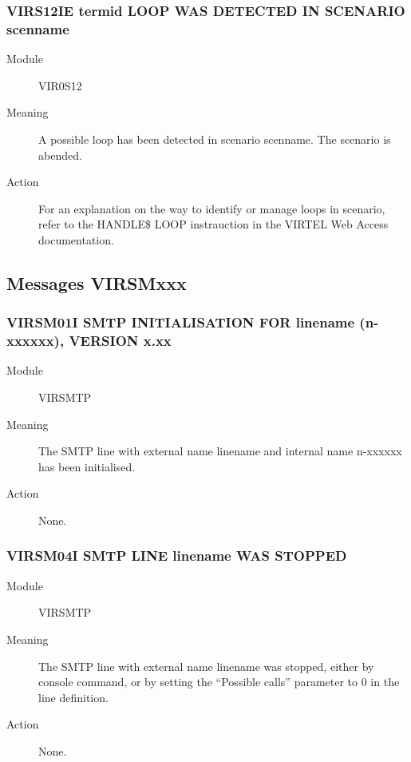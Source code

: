 \documentclass[letterpaper,10pt,english]{sphinxmanual}
\begin{document}
\subsubsection{VIRS12IE termid LOOP WAS DETECTED IN SCENARIO scenname}
\label{\detokenize{messages:virs12ie-termid-loop-was-detected-in-scenario-scenname}}\begin{description}
\item[{Module}] \leavevmode
VIR0S12

\item[{Meaning}] \leavevmode
A possible loop has been detected in scenario scenname. The scenario is abended.

\item[{Action}] \leavevmode
For an explanation on the way to identify or manage loops in scenario, refer to the HANDLE\$ LOOP instrauction in the VIRTEL Web Access documentation.

\end{description}


\subsection{Messages VIRSMxxx}
\label{\detokenize{messages:messages-virsmxxx}}

\subsubsection{VIRSM01I SMTP INITIALISATION FOR linename (n-xxxxxx), VERSION x.xx}
\label{\detokenize{messages:virsm01i-smtp-initialisation-for-linename-n-xxxxxx-version-x-xx}}\begin{description}
\item[{Module}] \leavevmode
VIRSMTP

\item[{Meaning}] \leavevmode
The SMTP line with external name linename and internal name n-xxxxxx has been initialised.

\item[{Action}] \leavevmode
None.

\end{description}


\subsubsection{VIRSM04I SMTP LINE linename WAS STOPPED}
\label{\detokenize{messages:virsm04i-smtp-line-linename-was-stopped}}\begin{description}
\item[{Module}] \leavevmode
VIRSMTP

\item[{Meaning}] \leavevmode
The SMTP line with external name linename was stopped, either by console command, or by setting the “Possible calls” parameter to 0 in the line definition.

\item[{Action}] \leavevmode
None.

\end{description}
\end{document}
